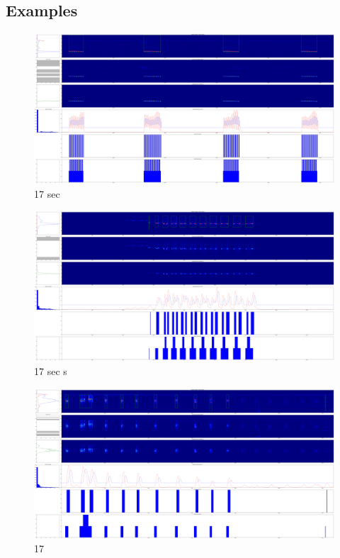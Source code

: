 \documentclass[a4paper]{article}
\begin{document}
\subsection{Examples}

\begin{figure}[H]
\begin{center}
\includegraphics[scale=0.07]{1test.png}\caption{17 sec }
\end{center}
\end{figure}


\begin{figure}[H]
\begin{center}
\includegraphics[scale=0.07]{2test.png}\caption{17 sec s}
\end{center}
\end{figure}


\begin{figure}[H]
\begin{center}
\includegraphics[scale=0.07]{3test.png}\caption{17 }
\end{center}
\end{figure}
\end{document}
